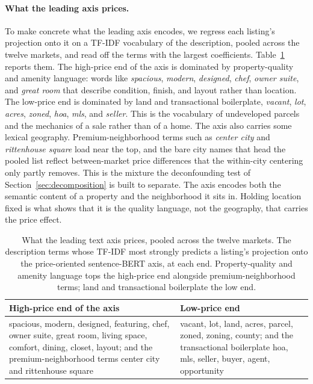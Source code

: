 \paragraph{What the leading axis prices.} To make concrete what the leading axis
encodes, we regress each listing's projection onto it on a TF-IDF vocabulary of
the description, pooled across the twelve markets, and read off the terms with the
largest coefficients. Table~\ref{tab:loadings} reports them. The high-price end of
the axis is dominated by property-quality and amenity language: words like
\emph{spacious}, \emph{modern}, \emph{designed}, \emph{chef}, \emph{owner suite},
and \emph{great room} that describe condition, finish, and layout rather than
location. The low-price end is dominated by land and transactional boilerplate,
\emph{vacant}, \emph{lot}, \emph{acres}, \emph{zoned}, \emph{hoa}, \emph{mls}, and
\emph{seller}. This is the vocabulary of undeveloped parcels and the mechanics of a sale
rather than of a home. The axis also carries some lexical geography.
Premium-neighborhood terms such as \emph{center city} and \emph{rittenhouse
square} load near the top, and the bare city names that head the pooled list
reflect between-market price differences that the within-city centering only
partly removes. This is the mixture the deconfounding test of
Section~\ref{sec:decomposition} is built to separate. The axis encodes both the
semantic content of a property and the neighborhood it sits in. Holding
location fixed is what shows that it is the quality language, not the geography,
that carries the price effect.

\begin{table}[H]
\centering
\caption{What the leading text axis prices, pooled across the twelve markets. The
description terms whose TF-IDF most strongly predicts a listing's projection onto
the price-oriented sentence-BERT axis, at each end. Property-quality and amenity
language tops the high-price end alongside premium-neighborhood terms; land and
transactional boilerplate the low end.}
\label{tab:loadings}
\small
\begin{tabular}{p{}p{}}
\toprule
High-price end of the axis & Low-price end \\
\midrule
spacious, modern, designed, featuring, chef, owner suite, great room, living
space, comfort, dining, closet, layout; and the premium-neighborhood terms center
city and rittenhouse square & vacant, lot, land, acres, parcel, zoned, zoning,
county; and the transactional boilerplate hoa, mls, seller, buyer, agent,
opportunity \\
\bottomrule
\end{tabular}
\end{table}
